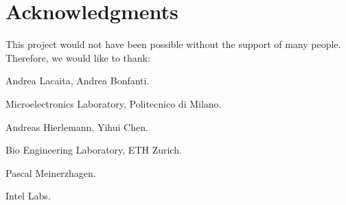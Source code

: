 \label{acknowledgments}

\section*{Acknowledgments}
This project would not have been possible without the support of many people. Therefore, we would like to thank:

\vspace{3 mm}

\noindent Andrea Lacaita, Andrea Bonfanti.

\noindent Microelectronics Laboratory, Politecnico di Milano.

\vspace{3 mm}

\noindent Andreas Hierlemann, Yihui Chen.

\noindent Bio Engineering Laboratory, ETH Zurich.

\vspace{3 mm}

\noindent Pascal Meinerzhagen.

\noindent Intel Labs.
